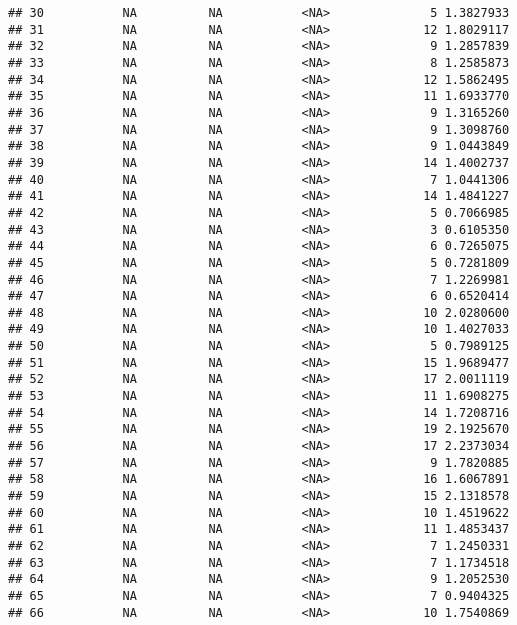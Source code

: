 \documentclass[]{article}
\begin{document}
\begin{verbatim}
## 30           NA          NA           <NA>              5 1.3827933
## 31           NA          NA           <NA>             12 1.8029117
## 32           NA          NA           <NA>              9 1.2857839
## 33           NA          NA           <NA>              8 1.2585873
## 34           NA          NA           <NA>             12 1.5862495
## 35           NA          NA           <NA>             11 1.6933770
## 36           NA          NA           <NA>              9 1.3165260
## 37           NA          NA           <NA>              9 1.3098760
## 38           NA          NA           <NA>              9 1.0443849
## 39           NA          NA           <NA>             14 1.4002737
## 40           NA          NA           <NA>              7 1.0441306
## 41           NA          NA           <NA>             14 1.4841227
## 42           NA          NA           <NA>              5 0.7066985
## 43           NA          NA           <NA>              3 0.6105350
## 44           NA          NA           <NA>              6 0.7265075
## 45           NA          NA           <NA>              5 0.7281809
## 46           NA          NA           <NA>              7 1.2269981
## 47           NA          NA           <NA>              6 0.6520414
## 48           NA          NA           <NA>             10 2.0280600
## 49           NA          NA           <NA>             10 1.4027033
## 50           NA          NA           <NA>              5 0.7989125
## 51           NA          NA           <NA>             15 1.9689477
## 52           NA          NA           <NA>             17 2.0011119
## 53           NA          NA           <NA>             11 1.6908275
## 54           NA          NA           <NA>             14 1.7208716
## 55           NA          NA           <NA>             19 2.1925670
## 56           NA          NA           <NA>             17 2.2373034
## 57           NA          NA           <NA>              9 1.7820885
## 58           NA          NA           <NA>             16 1.6067891
## 59           NA          NA           <NA>             15 2.1318578
## 60           NA          NA           <NA>             10 1.4519622
## 61           NA          NA           <NA>             11 1.4853437
## 62           NA          NA           <NA>              7 1.2450331
## 63           NA          NA           <NA>              7 1.1734518
## 64           NA          NA           <NA>              9 1.2052530
## 65           NA          NA           <NA>              7 0.9404325
## 66           NA          NA           <NA>             10 1.7540869

\end{verbatim}
\end{document}
